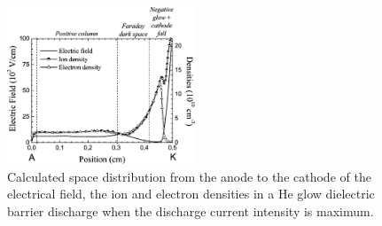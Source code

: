 \documentclass[a4paper,10pt,twoside]{article}
\begin{document}
		\twocolumn

			\begin{figure}
				\centering
				\includegraphics[width=0.5\textwidth]{figures/706nm@square/massinesp3fig5.pdf}
				\caption{Calculated space distribution from the anode to the cathode of	the electrical field, the ion and electron densities in a He glow dielectric barrier discharge when the discharge current intensity is maximum. \cite{Massines}}
				\label{img:massines}
			\end{figure}
\end{document}
